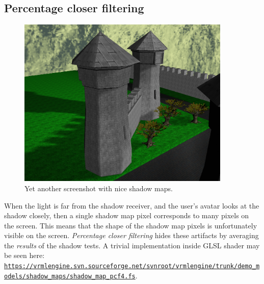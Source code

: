 \documentclass{acmsiggraph}                     %
\newcommand*{\myhref}[2]{\texttt{\href{#1}{\nolinkurl{#2}}}}
\begin{document}
\subsection{Percentage closer filtering}

\begin{figure}[b]
  \centering
  \includegraphics[width=4.0in]{sunny_street_above_view}
  \caption{Yet another screenshot with nice shadow maps.}
\end{figure}

When the light is far from the shadow receiver, and the user's avatar
looks at the shadow closely, then a single shadow map pixel
corresponds to many pixels on the screen. This means that the shape
of the shadow map pixels is unfortunately visible on the screen.
\emph{Percentage closer filtering} \cite{gpugems:pcf} hides these artifacts by
averaging
the \emph{results} of the shadow tests.
A trivial implementation inside GLSL shader may be seen here:
\myhref{https://vrmlengine.svn.sourceforge.net/svnroot/vrmlengine/trunk/demo\_models/shadow\_maps/shadow\_map\_pcf4.fs}{https://vrmlengine.svn.sourceforge.net/svnroot/vrmlengine/trunk/demo_models/shadow_maps/shadow_map_pcf4.fs}.
\end{document}
